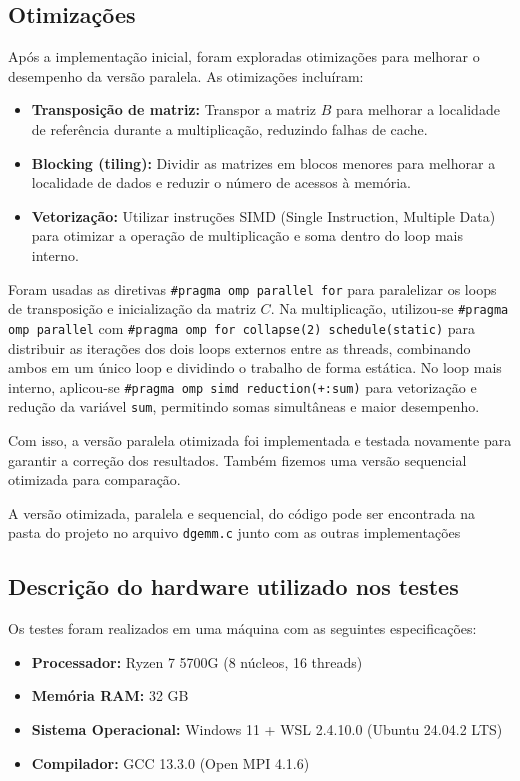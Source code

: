 \documentclass[12pt, a4paper]{article}
\begin{document}
	\subsection{Otimizações}

	Após a implementação inicial, foram exploradas otimizações para melhorar o desempenho
	da versão paralela. As otimizações incluíram:
	\begin{itemize}
		\item \textbf{Transposição de matriz:} Transpor a matriz $B$ para melhorar a localidade de referência
		durante a multiplicação, reduzindo falhas de cache.

		\item \textbf{Blocking (tiling):} Dividir as matrizes em blocos menores para melhorar a localidade de dados
		e reduzir o número de acessos à memória.

		\item \textbf{Vetorização:} Utilizar instruções SIMD (Single Instruction, Multiple Data) para otimizar a operação
		de multiplicação e soma dentro do loop mais interno.
	\end{itemize}

	Foram usadas as diretivas \texttt{\#pragma omp parallel for} para paralelizar os loops de transposição e inicialização da matriz $C$. Na multiplicação, utilizou-se \texttt{\#pragma omp parallel} com \texttt{\#pragma omp for collapse(2) schedule(static)} para distribuir as iterações dos dois loops externos entre as threads, combinando ambos em um único loop e dividindo o trabalho de forma estática. No loop mais interno, aplicou-se \texttt{\#pragma omp simd reduction(+:sum)} para vetorização e redução da variável \texttt{sum}, permitindo somas simultâneas e maior desempenho.

	Com isso, a versão paralela otimizada foi implementada e testada novamente para garantir a correção dos resultados. Também fizemos uma versão sequencial otimizada para comparação.

	A versão otimizada, paralela e sequencial, do código pode ser encontrada na pasta do projeto no arquivo \texttt{dgemm.c} junto com as outras implementações

    \subsection{Descrição do hardware utilizado nos testes}

    Os testes foram realizados em uma máquina com as seguintes especificações:
    \begin{itemize}
        \item \textbf{Processador:} Ryzen 7 5700G (8 núcleos, 16 threads)
        \item \textbf{Memória RAM:} 32 GB
        \item \textbf{Sistema Operacional:} Windows 11 + WSL 2.4.10.0 (Ubuntu 24.04.2 LTS)
        \item \textbf{Compilador:} GCC 13.3.0 (Open MPI 4.1.6)
    \end{itemize}
\end{document}
